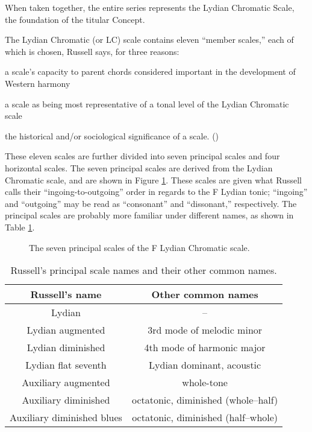\noindent When taken together, the entire series represents the Lydian
Chromatic Scale, the foundation of the titular Concept.

The Lydian Chromatic (or LC) scale contains eleven ``member scales,'' each of
which is chosen, Russell says, for three reasons:%
%
\begin{compactenum}[\qquad a.\ ]
    \singlespacing
    \item a scale's capacity to parent chords considered important in the
      development of Western harmony
    \item a scale as being most representative of a tonal level of the Lydian
      Chromatic scale
    \item the historical and/or sociological significance of a
      scale. ()
\end{compactenum}
%
These eleven scales are further divided into seven principal scales and four
horizontal scales. The seven principal scales are derived from the Lydian
Chromatic scale, and are shown in Figure \ref{lcc:principal-scales}. These
scales are given what Russell calls their ``ingoing-to-outgoing'' order in
regards to the F Lydian tonic; ``ingoing'' and ``outgoing'' may be read as
``consonant'' and ``dissonant,'' respectively.
The principal scales are probably more familiar under different names, as shown in
Table \ref{lcc:scale-names}.

\begin{figure}[p]
  \caption{The seven principal scales of the F Lydian Chromatic scale.}
  \label{lcc:principal-scales}
\end{figure}

\begin{table}[p]
  \setlength{\tabcolsep}{12pt}
  \centering
  \begin{tabular}{cc}
   Russell's name  & Other common names \\
   \hline
   \rule[1em]{0ex}{1ex}%
   Lydian & -- \\
   Lydian augmented & 3rd mode of melodic minor \\
   Lydian diminished & 4th mode of harmonic major \\
   Lydian flat seventh & Lydian dominant, acoustic \\
   Auxiliary augmented & whole-tone \\
   Auxiliary diminished & octatonic, diminished (whole--half) \\
   Auxiliary diminished blues & octatonic, diminished (half--whole)
  \end{tabular}
  \caption{Russell's principal scale names and their other common names.}
  \label{lcc:scale-names}
\end{table}

